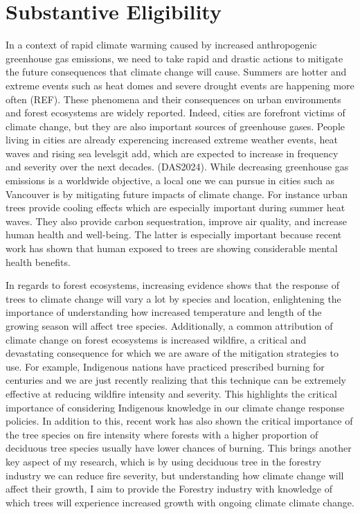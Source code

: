\documentclass[11pt,letter]{article}
\begin{document}
\section *{Substantive Eligibility} 
In a context of rapid climate warming caused by increased anthropogenic greenhouse gas emissions, we need to take rapid and drastic actions to mitigate the future consequences that climate change will cause. Summers are hotter and extreme events such as heat domes and severe drought events are happening more often (REF). These phenomena and their consequences on urban environments and forest ecosystems are widely reported. Indeed, cities are forefront victims of climate change, but they are also important sources of greenhouse gases. People living in cities are already experencing increased extreme weather events, heat waves and rising sea levelsgit add, which are expected to increase in frequency and severity over the next decades. (DAS2024). While decreasing greenhouse gas emissions is a worldwide objective, a local one we can pursue in cities such as Vancouver is by mitigating future impacts of climate change. For instance urban trees provide cooling effects which are especially important during summer heat waves. They also provide carbon sequestration, improve air quality, and increase human health and well-being. The latter is especially important because recent work has shown that human exposed to trees are showing considerable mental health benefits. 
\par
In regards to forest ecosystems, increasing evidence shows that the response of trees to climate change will vary a lot by species and location, enlightening the importance of understanding how increased temperature and length of the growing season will affect tree species. Additionally, a common attribution of climate change on forest ecosystems is increased wildfire, a critical and devastating consequence for which we are aware of the mitigation strategies to use. For example, Indigenous nations have practiced  prescribed burning for centuries and we are just recently realizing that this technique can be extremely effective at reducing wildfire intensity and severity. This highlights the critical importance of considering Indigenous knowledge in our climate change response policies. In addition to this, recent work has also shown the critical importance of the tree species on fire intensity where forests with a higher proportion of deciduous tree species usually have lower chances of burning. This brings another key aspect of my research, which is by using deciduous tree in the forestry industry we can reduce fire severity, but understanding how climate change will affect their growth, I aim to provide the Forestry industry with knowledge of which trees will experience increased growth with ongoing climate climate change. %
\end{document}
